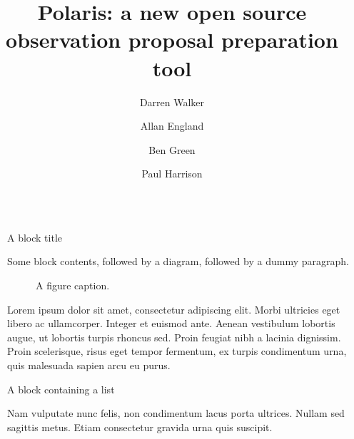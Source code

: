 \documentclass[final]{beamer}
\title{Polaris: a new open source observation proposal preparation tool}
\author{Darren Walker \and Allan England \and Ben Green \and Paul Harrison}
\institute[shortinst]{JCBA, The University of Manchester, UK}
\newlength{\sepwidth}
\newlength{\colwidth}
\newcommand{\separatorcolumn}{\begin{column}{\sepwidth}\end{column}}
\begin{document}

    \begin{frame}[t]
        \begin{columns}[t]
            \separatorcolumn

            \begin{column}{\colwidth}

                \begin{block}{A block title}

                    Some block contents, followed by a diagram, followed by a dummy paragraph.

                    \begin{figure}
                        \centering
                        \caption{A figure caption.}
                    \end{figure}

                    Lorem ipsum dolor sit amet, consectetur adipiscing elit. Morbi ultricies
                    eget libero ac ullamcorper. Integer et euismod ante. Aenean vestibulum
                    lobortis augue, ut lobortis turpis rhoncus sed. Proin feugiat nibh a
                    lacinia dignissim. Proin scelerisque, risus eget tempor fermentum, ex
                    turpis condimentum urna, quis malesuada sapien arcu eu purus.

                \end{block}

                \begin{block}{A block containing a list}

                    Nam vulputate nunc felis, non condimentum lacus porta ultrices. Nullam sed
                    sagittis metus. Etiam consectetur gravida urna quis suscipit.


\end{block}
\end{column}
\end{columns}
\end{frame}
\end{document}
